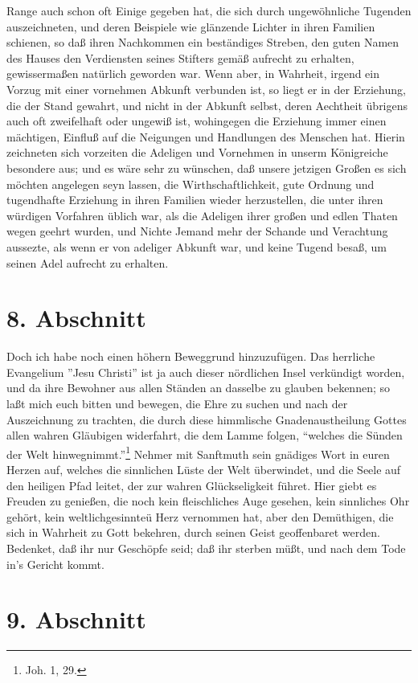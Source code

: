 Range auch schon oft Einige gegeben hat, die sich durch ungewöhnliche Tugenden
auszeichneten, und deren Beispiele wie glänzende Lichter in ihren Familien
schienen, so daß ihren Nachkommen ein beständiges Streben, den guten Namen des
Hauses den Verdiensten seines Stifters gemäß aufrecht zu erhalten, gewissermaßen
natürlich geworden war. Wenn aber, in Wahrheit, irgend ein Vorzug mit einer
vornehmen Abkunft verbunden ist, so liegt er in der Erziehung, die der Stand
gewahrt, und nicht in der Abkunft selbst, deren Aechtheit übrigens auch oft
zweifelhaft oder ungewiß ist, wohingegen die Erziehung immer einen mächtigen,
Einfluß auf die Neigungen und Handlungen des Menschen hat. Hierin zeichneten
sich vorzeiten die Adeligen und Vornehmen in unserm Königreiche besondere aus;
und es wäre sehr zu wünschen, daß unsere jetzigen Großen es sich möchten
angelegen seyn lassen, die Wirthschaftlichkeit, gute Ordnung und tugendhafte
Erziehung in ihren Familien wieder herzustellen, die unter ihren würdigen
Vorfahren üblich war, als die Adeligen ihrer großen und edlen Thaten wegen
geehrt wurden, und Nichte Jemand mehr der Schande und Verachtung aussezte, als
wenn er von adeliger Abkunft war, und keine Tugend besaß, um seinen Adel
aufrecht zu erhalten.

\section{8. Abschnitt}

Doch ich habe noch einen höhern Beweggrund hinzuzufügen. Das herrliche
Evangelium ''Jesu Christi'' ist ja auch dieser nördlichen Insel verkündigt
worden, und da ihre Bewohner aus allen Ständen an dasselbe zu glauben bekennen;
so laßt mich euch bitten und bewegen, die Ehre zu suchen und nach der
Auszeichnung zu trachten, die durch diese himmlische Gnadenaustheilung Gottes
allen wahren Gläubigen widerfahrt, die dem Lamme folgen, "`welches die Sünden
der Welt hinwegnimmt."'\footnote{Joh. 1, 29.} Nehmer mit Sanftmuth sein gnädiges
Wort in euren Herzen auf, welches die sinnlichen Lüste der Welt überwindet, und
die Seele auf den heiligen Pfad leitet, der zur wahren Glückseligkeit führet.
Hier giebt es Freuden zu genießen, die noch kein fleischliches Auge gesehen,
kein sinnliches Ohr gehört, kein weltlichgesinnteü Herz vernommen hat, aber den
Demüthigen, die sich in Wahrheit zu Gott bekehren, durch seinen Geist
geoffenbaret werden. Bedenket, daß ihr nur Geschöpfe seid; daß ihr sterben müßt,
und nach dem Tode in’s Gericht kommt.

\section{9. Abschnitt}

